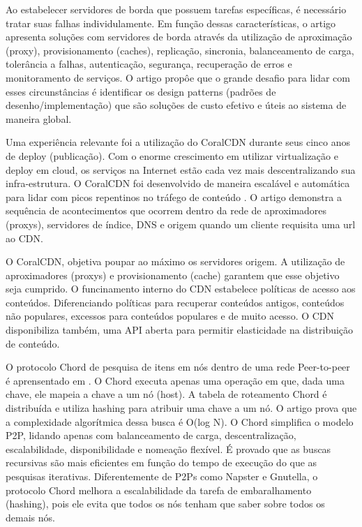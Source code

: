 Ao estabelecer servidores de borda que possuem tarefas específicas, 
é necessário tratar suas falhas individulamente.
Em função dessas características, o artigo apresenta soluções com servidores de
borda através da utilização de aproximação (proxy), provisionamento (caches), 
replicação, sincronia, balanceamento de carga, tolerância a falhas, 
autenticação, segurança, recuperação de erros e monitoramento de serviços. 
O artigo propôe que o grande desafio para lidar com esses circunstâncias é 
identificar os design patterns (padrões de desenho/implementação) que são 
soluções de custo efetivo e úteis ao sistema de maneira global.


Uma experiência relevante foi a utilização do CoralCDN durante seus cinco
anos de deploy (publicação).
Com o enorme crescimento em utilizar virtualização e deploy em cloud, 
os serviços na Internet estão cada vez mais descentralizando
sua infra-estrutura. 
O CoralCDN foi desenvolvido de maneira escalável e automática para lidar com 
picos repentinos no tráfego de conteúdo \citep{freedman2010experiences}. 
O artigo demonstra a sequência de acontecimentos que ocorrem dentro da rede de 
aproximadores (proxys), servidores de índice, DNS e origem quando um cliente 
requisita uma url ao CDN. 

O CoralCDN, objetiva poupar ao máximo os servidores origem. 
A utilização de aproximadores (proxys) e provisionamento (cache) 
garantem que esse objetivo seja cumprido. 
O funcinamento interno do CDN estabelece políticas de acesso aos conteúdos. 
Diferenciando políticas para recuperar conteúdos antigos, conteúdos não 
populares, excessos para conteúdos populares e de muito acesso. O CDN 
disponibiliza também, uma API aberta para permitir elasticidade na 
distribuição de conteúdo. 

O protocolo Chord de pesquisa de itens em nós dentro de uma 
rede Peer-to-peer é aprensentado em \citep{ion2001chord}. 
O Chord executa apenas uma operação em que, dada uma chave, 
ele mapeia a chave a um nó (host). 
A tabela de roteamento Chord é distribuída e utiliza hashing para 
atribuir uma chave a um nó. 
O artigo prova que a complexidade algorítmica dessa busca é O(log N).
O Chord simplifica o modelo P2P, lidando apenas com balanceamento de carga, 
descentralização, escalabilidade, disponibilidade e nomeação flexível. 
É provado que as buscas recursivas são mais eficientes em 
função do tempo de execução do que as pesquisas iterativas. 
Diferentemente de P2Ps como Napster e Gnutella, o protocolo Chord melhora a 
escalabilidade da tarefa de embaralhamento (hashing), pois ele evita que 
todos os nós tenham que saber sobre todos os demais nós. 

